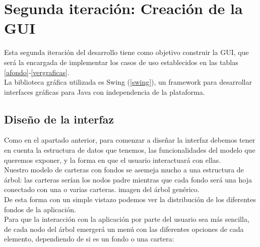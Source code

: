 \documentclass[12pt, a4paper]{book}
\begin{document}
\newpage
\section{Segunda iteración: Creación de la GUI}

Esta segunda iteración del desarrollo tiene como objetivo construir la \gls{GUI}, que será la encargada de implementar los casos de uso establecidos en las tablas \ref{afondo}-\ref{vergraficas}.
\\

La biblioteca gráfica utilizada es Swing (\ref{swing}), un framework para desarrollar interfaces gráficas para Java con independencia de la plataforma.

\subsection{Diseño de la interfaz}

Como en el apartado anterior, para comenzar a diseñar la interfaz debemos tener en cuenta la estructura de datos que tenemos, las funcionalidades del modelo que queremos exponer, y la forma en que el usuario interactuará con ellas.
\\

Nuestro modelo de carteras con fondos se asemeja mucho a una estructura de árbol: las carteras serían los nodos padre mientras que cada fondo será una hoja conectado con una o varias carteras. imagen del árbol genérico.
\\

De esta forma con un simple vistazo podemos ver la distribución de los diferentes fondos de la aplicación.
\\

Para que la interacción con la aplicación por parte del usuario sea más sencilla, de cada nodo del árbol emergerá un menú con las diferentes opciones de cada elemento, dependiendo de si es un fondo o una cartera:
\end{document}

